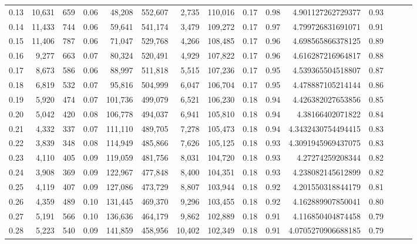 \begin{tabular}{rrrrrrrrrrrrrrr}
0.13 &  10,631 &    659 &  0.06 &   48,208 &  552,607 &    2,735 &  110,016 &  0.17 &  0.98 &       4.901127262729377 &      0.93 \\
0.14 &  11,433 &    744 &  0.06 &   59,641 &  541,174 &    3,479 &  109,272 &  0.17 &  0.97 &       4.799726831691071 &      0.91 \\
0.15 &  11,406 &    787 &  0.06 &   71,047 &  529,768 &    4,266 &  108,485 &  0.17 &  0.96 &       4.698565866378125 &      0.89 \\
0.16 &   9,277 &    663 &  0.07 &   80,324 &  520,491 &    4,929 &  107,822 &  0.17 &  0.96 &       4.616287216964817 &      0.88 \\
0.17 &   8,673 &    586 &  0.06 &   88,997 &  511,818 &    5,515 &  107,236 &  0.17 &  0.95 &       4.539365504518807 &      0.87 \\
0.18 &   6,819 &    532 &  0.07 &   95,816 &  504,999 &    6,047 &  106,704 &  0.17 &  0.95 &       4.478887105214144 &      0.86 \\
0.19 &   5,920 &    474 &  0.07 &  101,736 &  499,079 &    6,521 &  106,230 &  0.18 &  0.94 &       4.426382027653856 &      0.85 \\
0.20 &   5,042 &    420 &  0.08 &  106,778 &  494,037 &    6,941 &  105,810 &  0.18 &  0.94 &        4.38166402071822 &      0.84 \\
0.21 &   4,332 &    337 &  0.07 &  111,110 &  489,705 &    7,278 &  105,473 &  0.18 &  0.94 &      4.3432430754494415 &      0.83 \\
0.22 &   3,839 &    348 &  0.08 &  114,949 &  485,866 &    7,626 &  105,125 &  0.18 &  0.93 &      4.3091945969437075 &      0.83 \\
0.23 &   4,110 &    405 &  0.09 &  119,059 &  481,756 &    8,031 &  104,720 &  0.18 &  0.93 &        4.27274259208344 &      0.82 \\
0.24 &   3,908 &    369 &  0.09 &  122,967 &  477,848 &    8,400 &  104,351 &  0.18 &  0.93 &       4.238082145612899 &      0.82 \\
0.25 &   4,119 &    407 &  0.09 &  127,086 &  473,729 &    8,807 &  103,944 &  0.18 &  0.92 &       4.201550318844179 &      0.81 \\
0.26 &   4,359 &    489 &  0.10 &  131,445 &  469,370 &    9,296 &  103,455 &  0.18 &  0.92 &       4.162889907850041 &      0.80 \\
0.27 &   5,191 &    566 &  0.10 &  136,636 &  464,179 &    9,862 &  102,889 &  0.18 &  0.91 &       4.116850404874458 &      0.79 \\
0.28 &   5,223 &    540 &  0.09 &  141,859 &  458,956 &   10,402 &  102,349 &  0.18 &  0.91 &      4.0705270906688185 &      0.79 \\

\end{tabular}
